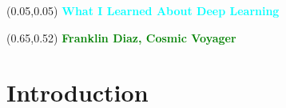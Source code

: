 \documentclass[aspectratio=169]{beamer} %
\begin{document}
\begin{frame}
    \setlength{\TPHorizModule}{\textwidth}
    \setlength{\TPVertModule}{\textwidth}
    \begin{textblock}{0.6}(0.05,0.05)
      \bfseries\Huge\textcolor{cyan}{What I Learned About Deep Learning}
    \end{textblock}
    \begin{textblock}{0.5}(0.65,0.52)
        \bfseries\textcolor{green}{Franklin Diaz, Cosmic Voyager}
    \end{textblock}
\end{frame}

\section{Introduction}
\end{document}
